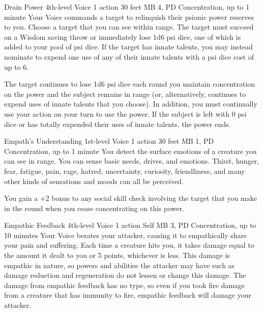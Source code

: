 \DndPowerHeader%
  {Drain Power}
  {4th-level Voice}
  {1 action}
  {30 feet}
  {MB 4, PD \lvlfour}
  {Concentration, up to 1 minute}
Your Voice commands a target to relinquish their psionic power
reserves to you.
Choose a target that you can see within range.
The target must succeed on a Wisdom saving throw
or immediately lose 1d6 psi dice, one of which is added
to your pool of psi dice.
If the target has innate talents,
you may instead nominate to expend one use of
any of their innate talents with a psi dice cost of up to 6.

The target continues to lose 1d6 psi dice each round you
maintain concentration on the power and the subject remains
in range (or, alternatively, continues to expend uses of
innate talents that you choose).
In addition, you must continually use your action on your turn
to use the power.
If the subject is left with 0 psi dice
or has totally expended their uses of innate talents,
the power ends.

\DndPowerHeader%
  {Empath's Understanding}
  {1st-level Voice}
  {1 action}
  {30 feet}
  {MB 1, PD \lvlone}
  {Concentration, up to 1 minute}
You detect the surface emotions of a creature you can see in range.
You can sense basic needs, drives, and emotions.
Thirst, hunger, fear, fatigue, pain, rage, hatred, uncertainty,
curiosity, friendliness, and many other kinds of sensations and moods
can all be perceived.

You gain a +2 bonus to any social skill check involving the target
that you make in the round when you cease concentrating on this power.

\DndPowerHeader%
  {Empathic Feedback}
  {4th-level Voice}
  {1 action}
  {Self}
  {MB 3, PD \lvlfour}
  {Concentration, up to 10 minutes}
Your Voice berates your attacker,
causing it to empathically share your pain and suffering.
Each time a creature hits you,
it takes damage equal to the amount it dealt to you or 5 points,
whichever is less.
This damage is empathic in nature,
so powers and abilities the attacker may have such as damage reduction
and regeneration do not lessen or change this damage.
The damage from empathic feedback has no type,
so even if you took fire damage from a creature
that has immunity to fire,
empathic feedback will damage your attacker.

